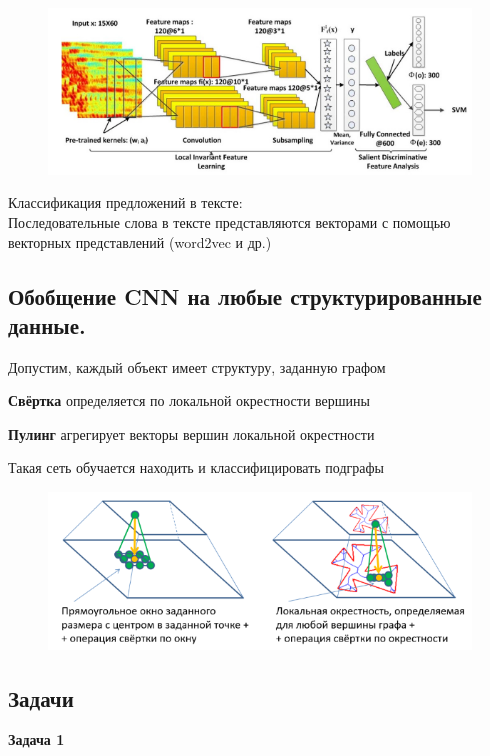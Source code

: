 \begin{description}
\begin{figure}[h]
\centering

\includegraphics[width=0.8\linewidth]{chapters/neural/images/pic.png}

\label{fig:voice_signals_nn}

\end{figure}

Классификация предложений в тексте:\\
Последовательные слова в тексте представляются векторами с помощью векторных представлений (word2vec и др.)\\

\newpage
\subsection{Обобщение CNN на любые структурированные данные.}
Допустим, каждый объект имеет структуру, заданную графом

\textbf{Свёртка} определяется по локальной окрестности вершины

\textbf{Пулинг} агрегирует векторы вершин локальной окрестности

Такая сеть обучается находить и классифицировать подграфы

\begin{figure}[h]

\centering

\includegraphics[width=0.8\linewidth]{chapters/neural/images/обобщениеCNN.png}

\label{fig:cnn_generalization}

\end{figure}

\subsection{Задачи}
\textbf{Задача 1}


\end{description}
